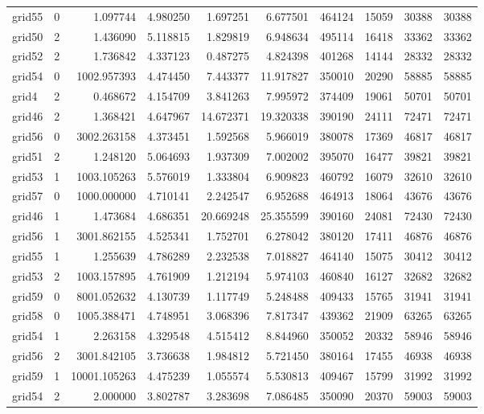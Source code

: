 \begin{longtable}{|l|r|r|r|r|r|r|r|r|r|}
grid55 & 0 & 1.097744 & 4.980250 & 1.697251 & 6.677501 & 464124 & 15059 & 30388 & 30388 \\
grid50 & 2 & 1.436090 & 5.118815 & 1.829819 & 6.948634 & 495114 & 16418 & 33362 & 33362 \\
grid52 & 2 & 1.736842 & 4.337123 & 0.487275 & 4.824398 & 401268 & 14144 & 28332 & 28332 \\
grid54 & 0 & 1002.957393 & 4.474450 & 7.443377 & 11.917827 & 350010 & 20290 & 58885 & 58885 \\
grid4 & 2 & 0.468672 & 4.154709 & 3.841263 & 7.995972 & 374409 & 19061 & 50701 & 50701 \\
grid46 & 2 & 1.368421 & 4.647967 & 14.672371 & 19.320338 & 390190 & 24111 & 72471 & 72471 \\
grid56 & 0 & 3002.263158 & 4.373451 & 1.592568 & 5.966019 & 380078 & 17369 & 46817 & 46817 \\
grid51 & 2 & 1.248120 & 5.064693 & 1.937309 & 7.002002 & 395070 & 16477 & 39821 & 39821 \\
grid53 & 1 & 1003.105263 & 5.576019 & 1.333804 & 6.909823 & 460792 & 16079 & 32610 & 32610 \\
grid57 & 0 & 1000.000000 & 4.710141 & 2.242547 & 6.952688 & 464913 & 18064 & 43676 & 43676 \\
grid46 & 1 & 1.473684 & 4.686351 & 20.669248 & 25.355599 & 390160 & 24081 & 72430 & 72430 \\
grid56 & 1 & 3001.862155 & 4.525341 & 1.752701 & 6.278042 & 380120 & 17411 & 46876 & 46876 \\
grid55 & 1 & 1.255639 & 4.786289 & 2.232538 & 7.018827 & 464140 & 15075 & 30412 & 30412 \\
grid53 & 2 & 1003.157895 & 4.761909 & 1.212194 & 5.974103 & 460840 & 16127 & 32682 & 32682 \\
grid59 & 0 & 8001.052632 & 4.130739 & 1.117749 & 5.248488 & 409433 & 15765 & 31941 & 31941 \\
grid58 & 0 & 1005.388471 & 4.748951 & 3.068396 & 7.817347 & 439362 & 21909 & 63265 & 63265 \\
grid54 & 1 & 2.263158 & 4.329548 & 4.515412 & 8.844960 & 350052 & 20332 & 58946 & 58946 \\
grid56 & 2 & 3001.842105 & 3.736638 & 1.984812 & 5.721450 & 380164 & 17455 & 46938 & 46938 \\
grid59 & 1 & 10001.105263 & 4.475239 & 1.055574 & 5.530813 & 409467 & 15799 & 31992 & 31992 \\
grid54 & 2 & 2.000000 & 3.802787 & 3.283698 & 7.086485 & 350090 & 20370 & 59003 & 59003 \\

\end{longtable}
